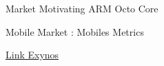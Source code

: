 %
\begin{Frame}{Market Motivating ARM Octo Core}
  \begin{block}{Mobile Market : Mobiles Metrics}
  \end{block}   
  \href{https://fr.wikipedia.org/wiki/Exynos}{Link Exynos}
\end{Frame}


